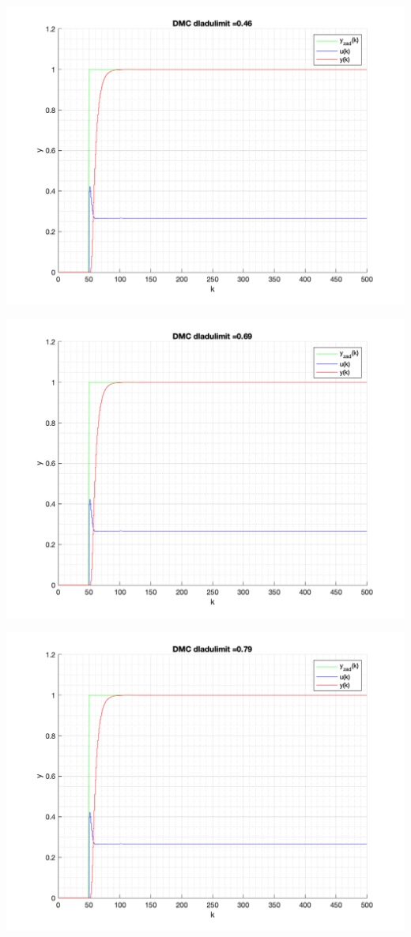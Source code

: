 \documentclass[a4paper, 11pt]{article}
\begin{document}
\begin{enumerate}
 \includegraphics[width=\linewidth]{./ModelsP6_dulimit/P4_DMC_dulimit_0_46_png.png} 
 
 \includegraphics[width=\linewidth]{./ModelsP6_dulimit/P4_DMC_dulimit_0_69_png.png} 
 
 \includegraphics[width=\linewidth]{./ModelsP6_dulimit/P4_DMC_dulimit_0_79_png.png} 
 

\end{enumerate}
\end{document}
